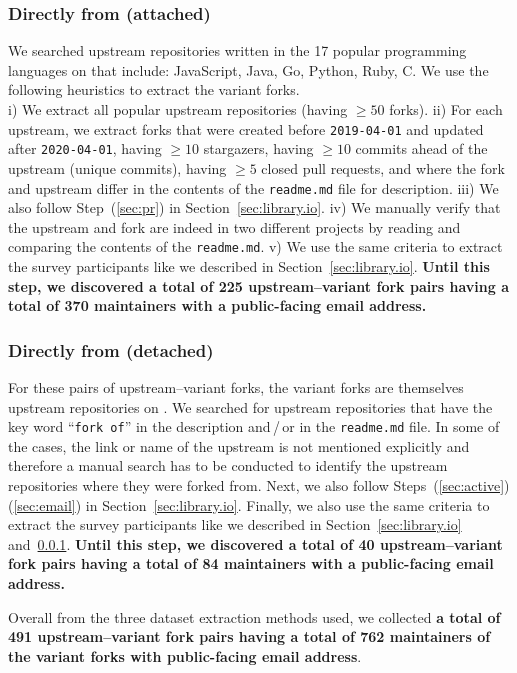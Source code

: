 \subsubsection{Directly from \gh (attached)}
\label{sec:github-attached}
We searched upstream repositories written in the 17 popular programming languages on \gh that include: JavaScript, Java, Go, Python, Ruby, C. We use the following heuristics to extract the variant forks.\\i) We extract all popular upstream repositories (having $\geq 50$ forks). ii) For each upstream, we extract forks that were created before \texttt{2019-04-01} and updated after \texttt{2020-04-01}, having $\geq 10$ stargazers, having $\geq 10$ commits ahead of the upstream (unique commits), having $\geq 5$ closed pull requests, and where the fork and upstream differ in the contents of the \texttt{readme.md} file for description. iii) We also follow Step~(\ref{sec:pr}) in Section~\ref{sec:library.io}.
iv) We manually verify that the upstream and fork are indeed in two different projects by reading and comparing the contents of the \texttt{readme.md}. v) We use the same criteria to extract the survey participants like we described in Section~\ref{sec:library.io}. \textbf{Until this step, we discovered a total of 225 upstream--variant fork pairs having a total of 370 maintainers with a public-facing email address.}

\subsubsection{Directly from \gh (detached)}
\label{sec:github-detached}
For these pairs of upstream--variant forks, the variant forks are themselves upstream repositories on \gh. 
We searched for upstream repositories that have the key word ``\texttt{fork of}'' in the description and\,/\,or in the \texttt{readme.md} file. In some of the cases, the link or name of the upstream is not mentioned explicitly and therefore a manual search has to be conducted to identify the upstream repositories where they were forked from. Next, we also follow Steps~(\ref{sec:active})\ra (\ref{sec:email}) in Section~\ref{sec:library.io}.
Finally, we also use the same criteria to extract the survey participants like we described in Section~\ref{sec:library.io} and~\ref{sec:github-attached}. \textbf{Until this step, we discovered a total of 40 upstream--variant fork pairs having a total of 84 maintainers with a public-facing email address.}

\nd Overall from the three dataset extraction methods used, we collected \textbf{a total of 491 upstream--variant fork pairs having a total of 762 maintainers of the variant forks with public-facing email address}. 

